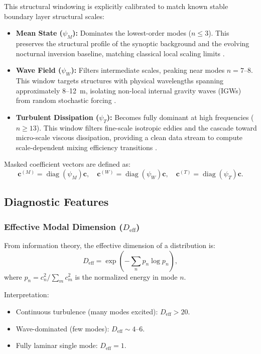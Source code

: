\documentclass[11pt,a4paper]{article}
\begin{document}
This structural windowing is explicitly calibrated to match known stable boundary layer structural scales:
\begin{itemize}
    \item \textbf{Mean State ($\psi_M$):} Dominates the lowest-order modes ($n \leq 3$). This preserves the structural profile of the synoptic background and the evolving nocturnal inversion baseline, matching classical local scaling limits \citep{Nieuwstadt1984}.
    \item \textbf{Wave Field ($\psi_W$):} Filters intermediate scales, peaking near modes $n = 7$--$8$. This window targets structures with physical wavelengths spanning approximately 8--12~m, isolating non-local internal gravity waves (IGWs) from random stochastic forcing \citep{Sun2015, Barbano2022}.
    \item \textbf{Turbulent Dissipation ($\psi_T$):} Becomes fully dominant at high frequencies ($n \geq 13$). This window filters fine-scale isotropic eddies and the cascade toward micro-scale viscous dissipation, providing a clean data stream to compute scale-dependent mixing efficiency transitions \citep{Li2016, Garanaik2019}.
\end{itemize}

Masked coefficient vectors are defined as:
\begin{equation}
\mathbf{c}^{(M)} = \operatorname{diag}(\psi_M) \mathbf{c}, \quad \mathbf{c}^{(W)} = \operatorname{diag}(\psi_W) \mathbf{c}, \quad \mathbf{c}^{(T)} = \operatorname{diag}(\psi_T) \mathbf{c}.
\end{equation}

\subsection{Diagnostic Features}
\label{sec:methods:diagnostics}

\subsubsection{Effective Modal Dimension ($D_{\mathrm{eff}}$)}

From information theory, the effective dimension of a distribution is:
\begin{equation}
D_{\mathrm{eff}} = \exp\left( -\sum_n p_n \log p_n \right),
\label{eq:d_eff}
\end{equation}
where $p_n = c_n^2 / \sum_m c_m^2$ is the normalized energy in mode $n$.

Interpretation:
\begin{itemize}
  \item Continuous turbulence (many modes excited): $D_{\mathrm{eff}} > 20$.
  \item Wave-dominated (few modes): $D_{\mathrm{eff}} \sim 4$--$6$.
  \item Fully laminar single mode: $D_{\mathrm{eff}} = 1$.
\end{itemize}
\end{document}
